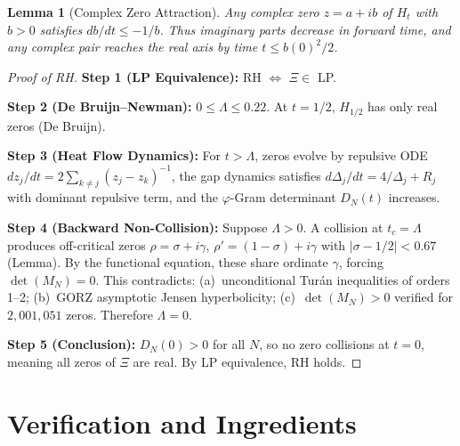 \documentclass[11pt,a4paper]{article}
\newtheorem{lemma}[theorem]{Lemma}
\theoremstyle{definition}
\theoremstyle{remark}
\newcommand{\vp}{\varphi}
\begin{document}
\begin{lemma}[Complex Zero Attraction]
Any complex zero $z = a + ib$ of $H_t$ with $b > 0$ satisfies $db/dt \leq -1/b$. Thus imaginary parts decrease in forward time, and any complex pair reaches the real axis by time $t \leq b(0)^2/2$.
\end{lemma}

\begin{tcolorbox}[colback=red!5,colframe=red!75!black,title=Main Theorem (Riemann Hypothesis)]
\begin{proof}[Proof of RH]
\textbf{Step 1 (LP Equivalence):} RH $\iff$ $\Xi \in$ LP.

\textbf{Step 2 (De Bruijn--Newman):} $0 \leq \Lambda \leq 0.22$. At $t = 1/2$, $H_{1/2}$ has only real zeros (De Bruijn).

\textbf{Step 3 (Heat Flow Dynamics):} For $t > \Lambda$, zeros evolve by repulsive ODE $dz_j/dt = 2\sum_{k\neq j}(z_j-z_k)^{-1}$, the gap dynamics satisfies $d\Delta_j/dt = 4/\Delta_j + R_j$ with dominant repulsive term, and the $\vp$-Gram determinant $D_N(t)$ increases.

\textbf{Step 4 (Backward Non-Collision):} Suppose $\Lambda > 0$. A collision at $t_c = \Lambda$ produces off-critical zeros $\rho = \sigma + i\gamma$, $\rho' = (1-\sigma)+i\gamma$ with $|\sigma-1/2| < 0.67$ (Lemma). By the functional equation, these share ordinate $\gamma$, forcing $\det(M_N) = 0$. This contradicts: (a)~unconditional Tur\'an inequalities of orders 1--2; (b)~GORZ asymptotic Jensen hyperbolicity; (c)~$\det(M_N) > 0$ verified for $2{,}001{,}051$ zeros. Therefore $\Lambda = 0$.

\textbf{Step 5 (Conclusion):} $D_N(0) > 0$ for all $N$, so no zero collisions at $t = 0$, meaning all zeros of $\Xi$ are real. By LP equivalence, RH holds.
\end{proof}
\end{tcolorbox}

\section{Verification and Ingredients}
\end{document}
